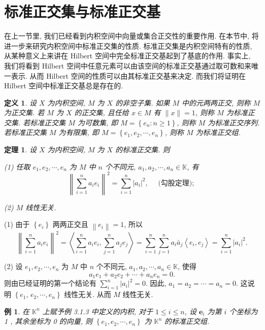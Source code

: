 \documentclass[openany]{ctexbook}
\makeatletter
\theoremstyle{kaiti}
\newtheorem{definition}{定义}[section]
\newtheorem{theorem}{定理}[section]
\theoremstyle{normal}
\newtheorem{example}{例}[section]
\renewenvironment{proof}[1][\proofname]{\par
    \pushQED{\qed}%
    \normalfont \topsep6\p@\@plus6\p@\relax
    \trivlist
    \item\relax
    {\heiti #1}\hspace{2\labelsep}\ignorespaces
  }{%
    \popQED\endtrivlist\@endpefalse
  }
\makeatother
\begin{document}
\section{标准正交集与标准正交基}

在上一节里, 我们已经看到内积空间中向量或集合正交性的重要作用. 在本节中, 将进一步来研究内积空间中标准正交集的性质. 标准正交集是内积空间特有的性质, 从某种意义上来讲在 Hilbert 空间中完全标准正交基起到了基底的作用. 事实上, 我们将看到 Hilbert 空间中任意元素可以由该空间的标准正交基通过取可数和来唯一表示. 从而 Hilbert 空间的性质可以由其标准正交基来决定. 而我们将证明在 Hilbert 空间中标准正交基总是存在的.

\begin{definition}
  设 $X$ 为内积空间, $M$ 为 $X$ 的非空子集. 如果 $M$ 中的元两两正交, 则称 $M$ 为正交集. 若 $M$ 为 $X$ 的正交集, 且任给 $x \in M$ 有 $\|x\|=1$, 则称 $M$ 为标准正交集. 若标准正交集 $M$ 为可数集, 即 $M=\left\{e_n: n \geqslant 1\right\}$, 则称 $M$ 为标准正交序列. 若标准正交集 $M$ 为有限集, 即 $M=\left\{e_1, e_2, \cdots, e_n\right\}$, 则称 $M$ 为标准正交组.
\end{definition}

\begin{theorem}
设 $X$ 为内积空间, $M$ 为 $X$ 的标准正交集. 则

(1) 任取 $e_1, e_2, \cdots, e_n$ 为 $M$ 中 $n$ 个不同元, $a_1, a_2, \cdots, a_n \in \mathbb{K}$, 有
$$
\left\|\sum_{i=1}^n a_{i} e_{i}\right\|^2=\sum_{i=1}^n\left|a_{i}\right|^2, \quad \text { (勾股定理); }
$$

(2) $M$ 线性无关.
\end{theorem}

\begin{proof}
(1) 由于 $\left\{e_{i}\right\}$ 两两正交且 $\left\|e_{i}\right\|=1$, 所以
$$
\left\|\sum_{i=1}^n a_{i} e_{i}\right\|^2=\left\langle\sum_{i=1}^n a_{i} e_{i}, \sum_{j=1}^n a_{j} e_{j}\right\rangle=\sum_{i=1}^n \sum_{j=1}^n a_{i} \bar{a}_{j}\left\langle e_{i}, e_{j}\right\rangle=\sum_{i=1}^n\left|a_{i}\right|^2.
$$

(2) 设 $e_1, e_2, \cdots, e_n$ 为 $M$ 中 $n$ 个不同元, $a_1, a_2, \cdots, a_n \in \mathbb{K}$, 使得
$$
a_1 e_1+a_2 e_2+\cdots+a_n e_n=0.
$$
则由已经证明的第一个结论有 $\sum_{i=1}^n\left|a_{i}\right|^2=0$. 因此, $a_1=a_2=\cdots=a_n=0$. 这说明 $\left\{e_1\right.$, $\left.e_2, \cdots, e_n\right\}$ 线性无关. 从而 $M$ 线性无关.
\end{proof}

\begin{example}
在 $\mathbb{K}^n$ 上赋予例 3.1.3 中定义的内积, 对于 $1 \leqslant i \leqslant n$, 设 $\boldsymbol{e}_{i}$ 为第 $i$ 个坐标为 1 , 其余坐标为 0 的向量, 则 $\left\{e_1, e_2, \cdots, e_n\right\}$ 为 $\mathbb{K}^n$ 的标准正交组.
\end{example}
\end{document}
